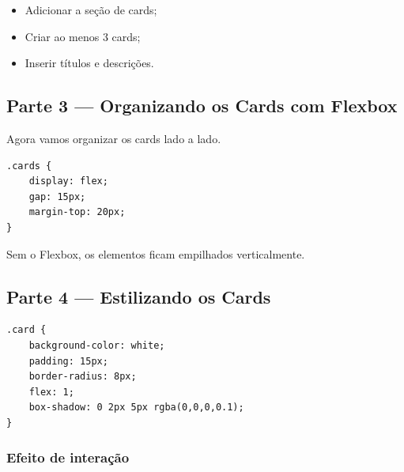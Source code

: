 \documentclass[12pt,a4paper]{article}
\begin{document}
\begin{boxAtividade}[Atividade 2]

\begin{itemize}
\item Adicionar a seção de cards;
\item Criar ao menos 3 cards;
\item Inserir títulos e descrições.
\end{itemize}

\end{boxAtividade}


\subsection{Parte 3 — Organizando os Cards com Flexbox}

Agora vamos organizar os cards lado a lado.

\begin{boxCodigo}
\begin{verbatim}
.cards {
    display: flex;
    gap: 15px;
    margin-top: 20px;
}
\end{verbatim}
\end{boxCodigo}

\begin{boxDica}
Sem o Flexbox, os elementos ficam empilhados verticalmente.
\end{boxDica}


\subsection{Parte 4 — Estilizando os Cards}

\begin{boxCodigo}
\begin{verbatim}
.card {
    background-color: white;
    padding: 15px;
    border-radius: 8px;
    flex: 1;
    box-shadow: 0 2px 5px rgba(0,0,0,0.1);
}
\end{verbatim}
\end{boxCodigo}

\subsubsection{Efeito de interação}
\end{document}

